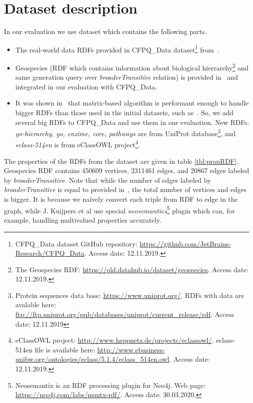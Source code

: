 \section{Dataset description}\label{section:dataset}

In our evaluation we use dataset which contains the following parts.
\begin{itemize}
\item The real-world data RDFs provided in CFPQ\_Data dataset\footnote{CFPQ\_Data dataset GitHub repository: \url{https://github.com/JetBrains-Research/CFPQ_Data}. Access date: 12.11.2019.} from~\cite{Mishin:2019:ECP:3327964.3328503}.
\item Geospecies (RDF which contains information about biological hierrarchy\footnote{The Geospecies RDF: \url{https://old.datahub.io/dataset/geospecies}. Access date: 12.11.2019.} and same generation query over \textit{broaderTransitive} relation) is provided in~\cite{Kuijpers:2019:ESC:3335783.3335791} and integrated in our evaluation with CFPQ\_Data.
\item It was shown in~\cite{Mishin:2019:ECP:3327964.3328503} that matrix-based algorithm is performant enough to handle bigger RDFs than those used in the initial datasets, such as~\cite{RDF}.
So, we add several big RDFs to CFPQ\_Data and use them in our evaluation.
New RDFs: \textit{go-hierarchy, go, enzime, core, pathways} are from UniProt database\footnote{Protein sequences data base: \url{https://www.uniprot.org/}. RDFs with data are avalable here: \url{ftp://ftp.uniprot.org/pub/databases/uniprot/current_release/rdf}. Access date: 12.11.2019}, and \textit{eclass-514en} is from eClassOWL project\footnote{eClassOWL project: \url{http://www.heppnetz.de/projects/eclassowl/}. eclass-514en file is available here: \url{http://www.ebusiness-unibw.org/ontologies/eclass/5.1.4/eclass_514en.owl}. Access date: 12.11.2019.}.
\end{itemize}

The properties of the RDFs from the dataset are given in table \ref{tbl:propRDF}. 
Geospecies RDF contains 450609 vertices, 2311461 edges, and 20867 edges labeled by \textit{broaderTransitive}.
Note that while the number of edges labeled by \textit{broaderTransitive} is equal to provided in~\cite{Kuijpers:2019:ESC:3335783.3335791}, the total number of vertices and edges is bigger. It is because we naively convert each triple from RDF to edge in the graph, while J. Kuijpers et al use special \textit{neosemantics}\footnote{Neosemantix is an RDF processing plugin for Neo4j. Web page: \url{https://neo4j.com/labs/nsmtx-rdf/}. Access date: 30.03.2020.} plugin which can, for example, handling multivalued properties accurately.  

